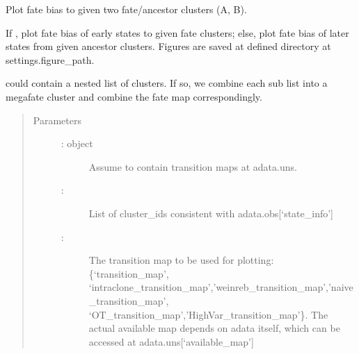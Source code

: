 \documentclass[letterpaper,10pt,english]{sphinxmanual}
\begin{document}
\begin{fulllineitems}
\label{\detokenize{cospar.pl.fate_bias_from_binary_competition:cospar.pl.fate_bias_from_binary_competition}}
Plot fate bias to given two fate/ancestor clusters (A, B).

If , plot fate bias of early
states to given fate clusters; else, plot fate bias of later states
from given ancestor clusters. Figures are saved at defined
directory at settings.figure\_path.

 could contain a nested list of clusters. If so, we
combine each sub list into a mega\sphinxhyphen{}fate cluster and combine the fate
map correspondingly.
\begin{quote}\begin{description}
\item[{Parameters}] \leavevmode\begin{description}
\item[{ :  object}] \leavevmode
Assume to contain transition maps at adata.uns.

\item[{ : }] \leavevmode
List of cluster\_ids consistent with adata.obs{[}‘state\_info’{]}

\item[{ : }] \leavevmode
The transition map to be used for plotting: \{‘transition\_map’,
‘intraclone\_transition\_map’,’weinreb\_transition\_map’,’naive\_transition\_map’,
‘OT\_transition\_map’,’HighVar\_transition\_map’\}. The actual available
map depends on adata itself, which can be accessed at adata.uns{[}‘available\_map’{]}


\end{description}
\end{description}
\end{quote}
\end{fulllineitems}
\end{document}
